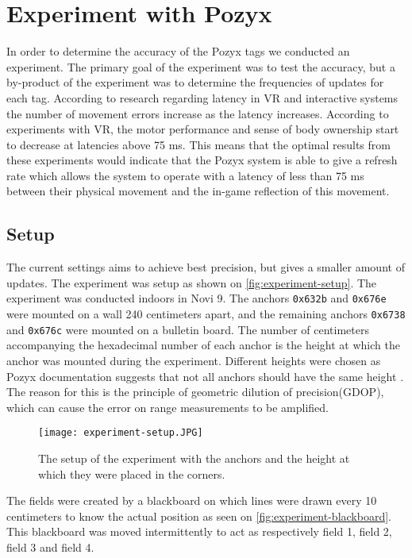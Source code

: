 \section{Experiment with Pozyx}
In order to determine the accuracy of the Pozyx tags we conducted an experiment.
The primary goal of the experiment was to test the accuracy, but a by-product of the experiment was to determine the frequencies of updates for each tag.
According to research regarding latency in VR \cite{WaltemateThomas2016Tiol} and interactive systems \cite{10.1145/169059.169431} the number of movement errors increase as the latency increases.
According to experiments with VR, the motor performance and sense of body ownership start to decrease at latencies above 75 ms.
This means that the optimal results from these experiments would indicate that the Pozyx system is able to give a refresh rate which allows the system to operate with a latency of less than 75 ms between their physical movement and the in-game reflection of this movement.

\subsection{Setup}
The current settings aims to achieve best precision, but gives a smaller amount of updates.
The experiment was setup as shown on \autoref{fig:experiment-setup}. 
The experiment was conducted indoors in Novi 9. 
The anchors \texttt{0x632b} and \texttt{0x676e} were mounted on a wall 240 centimeters apart, and the remaining anchors \texttt{0x6738} and \texttt{0x676c} were mounted on a bulletin board.
The number of centimeters accompanying the hexadecimal number of each anchor is the height at which the anchor was mounted during the experiment.
Different heights were chosen as Pozyx documentation suggests that not all anchors should have the same height \cite{pozyx-AnchorHeights}.
The reason for this is the principle of geometric dilution of precision(GDOP), which can cause the error on range measurements to be amplified.

\begin{figure}[H]
    \centering
    \texttt{[image: experiment-setup.JPG]}
    \caption{The setup of the experiment with the anchors and the height at which they were placed in the corners.}
    \label{fig:experiment-setup}
\end{figure}
\noindent
The fields were created by a blackboard on which lines were drawn every 10 centimeters to know the actual position as seen on \autoref{fig:experiment-blackboard}.
This blackboard was moved intermittently to act as respectively field 1, field 2, field 3 and field 4.

